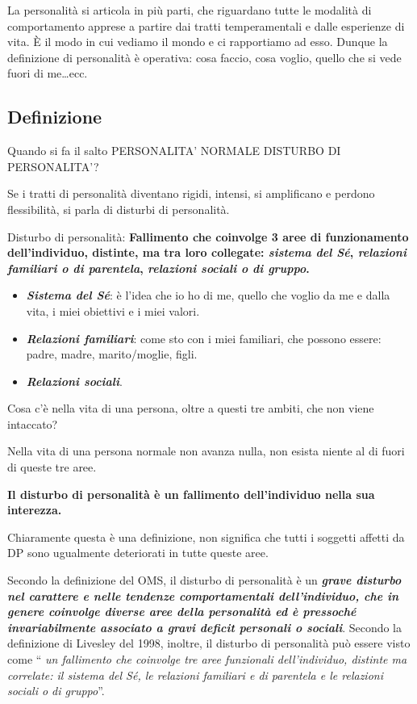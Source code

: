 La personalità si articola in più parti, che riguardano tutte le
modalità di comportamento apprese a partire dai tratti temperamentali e
dalle esperienze di vita. È il modo in cui vediamo il mondo e ci
rapportiamo ad esso. Dunque la definizione di personalità è operativa:
cosa faccio, cosa voglio, quello che si vede fuori di me\ldots{}ecc.

\subsection{Definizione}

Quando si fa il salto PERSONALITA' NORMALE DISTURBO DI PERSONALITA'?

Se i tratti di personalità diventano rigidi, intensi, si amplificano e
perdono flessibilità, si parla di disturbi di personalità.

Disturbo di personalità: \textbf{Fallimento che coinvolge 3 aree di
funzionamento dell'individuo, distinte, ma tra loro collegate:
\emph{sistema del Sé}, \emph{relazioni familiari o di parentela},
\emph{relazioni sociali o di gruppo}.}

\begin{itemize}
\item
  \emph{\textbf{Sistema del Sé}}: è l'idea che io ho di me, quello che
  voglio da me e dalla vita, i miei obiettivi e i miei valori.
\item
  \emph{\textbf{Relazioni familiari}}: come sto con i miei familiari,
  che possono essere: padre, madre, marito/moglie, figli.
\item
  \emph{\textbf{Relazioni sociali}}.
\end{itemize}

Cosa c'è nella vita di una persona, oltre a questi tre ambiti, che non
viene intaccato?

Nella vita di una persona normale non avanza nulla, non esista niente al
di fuori di queste tre aree.

\textbf{Il disturbo di personalità è un fallimento dell'individuo nella
sua interezza.}

Chiaramente questa è una definizione, non significa che tutti i soggetti
affetti da DP sono ugualmente deteriorati in tutte queste aree.

Secondo la definizione del OMS, il disturbo di personalità è un
\textbf{\emph{grave disturbo nel carattere e nelle tendenze
comportamentali dell'individuo, che in genere coinvolge diverse aree
della personalità ed è pressoché invariabilmente associato a gravi
deficit personali o sociali}}. Secondo la definizione di Livesley del
1998, inoltre, il disturbo di personalità può essere visto come ``
\emph{un fallimento che coinvolge tre aree funzionali dell'individuo,
distinte ma correlate: il sistema del Sé, le relazioni familiari e di
parentela e le relazioni sociali o di gruppo}''.

